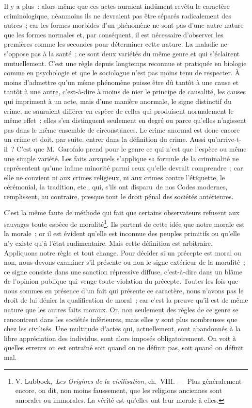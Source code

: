 \documentclass[french,twoside]{book} %
\begin{document}
Il y a plus : alors même que ces actes auraient indûment revêtu le caractère criminologique, néanmoins ils ne devraient pas être séparés radicalement des autres ; car les formes morbides d’un phénomène ne sont pas d’une autre nature que les formes normales et, par conséquent, il est nécessaire d’observer les premières comme les secondes pour déterminer cette nature. La maladie ne s’oppose pas à la santé ; ce sont deux variétés du même genre et qui s’éclairent mutuellement. C’est une règle depuis longtemps reconnue et pratiquée en biologie comme en psychologie et que le sociologue n’est pas moins tenu de respecter. À moins d’admettre qu’un même phénomène puisse être dû tantôt à une cause et tantôt à une autre, c’est-à-dire à moins de nier le principe de causalité, les causes qui impriment à un acte, mais d’une manière anormale, le signe distinctif du crime, ne sauraient différer en espèce de celles qui produisent normalement le même effet ; elles s’en distinguent seulement en degré ou parce qu’elles n’agissent pas dans le même ensemble de circonstances. Le crime anormal est donc encore un crime et doit, par suite, entrer dans la définition du crime. Aussi qu’arrive-t-il ? C’est que M. Garofalo prend pour le genre ce qui n’est que l’espèce ou même une simple variété. Les faits auxquels s’applique sa formule de la criminalité ne représentent qu’une infime minorité parmi ceux qu’elle devrait comprendre ; car elle ne convient ni aux crimes religieux, ni aux crimes contre l’étiquette, le cérémonial, la tradition, etc., qui, s’ils ont disparu de nos Codes modernes, remplissent, au contraire, presque tout le droit pénal des sociétés antérieures.\par
C’est la même faute de méthode qui fait que certains observateurs refusent aux sauvages toute espèce de moralité\footnote{ V. Lubbock, \emph{Les Origines de la civilisation}, ch. VIII. — Plus généralement encore, on dit, non moins faussement, que les religions anciennes sont amorales ou immorales. La vérité est qu’elles ont leur morale à elles.}. Ils partent de cette idée que notre morale est la morale ; or il est évident qu’elle est inconnue des peuples primitifs ou qu’elle n’y existe qu’à l’état rudimentaire. Mais cette définition est arbitraire. Appliquons notre règle et tout change. Pour décider si un précepte est moral ou non, nous devons examiner s’il présente ou non le signe extérieur de la moralité ; ce signe consiste dans une sanction répressive diffuse, c’est-à-dire dans un blâme de l’opinion publique qui venge toute violation du précepte. Toutes les fois que nous sommes en présence d’un fait qui présente ce caractère, nous n’avons pas le droit de lui dénier la qualification de moral ; car c’est la preuve qu’il est de même nature que les autres faits moraux. Or, non seulement des règles de ce genre se rencontrent dans les sociétés inférieures, mais elles y sont plus nombreuses que chez les civilisés. Une multitude d’actes qui, actuellement, sont abandonnés à la libre appréciation des individus, sont alors imposés obligatoirement. On voit à quelles erreurs on est entraîné soit quand on ne définit pas, soit quand on définit mal.\par
\end{document}
